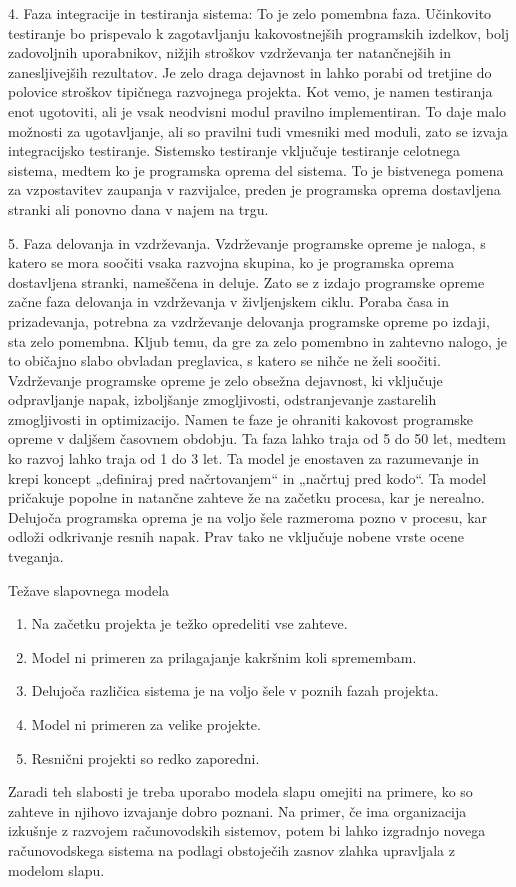 \documentclass[a4paper,12pt,openright]{book}
\begin{document}
4. Faza integracije in testiranja sistema: 
 To je zelo pomembna faza. Učinkovito testiranje bo prispevalo k zagotavljanju kakovostnejših programskih izdelkov, bolj zadovoljnih uporabnikov, nižjih stroškov vzdrževanja ter natančnejših in zanesljivejših rezultatov. Je zelo draga dejavnost in lahko porabi od tretjine do polovice stroškov tipičnega razvojnega projekta.
Kot vemo, je namen testiranja enot ugotoviti, ali je vsak neodvisni modul pravilno implementiran. To daje malo možnosti za ugotavljanje, ali so pravilni tudi vmesniki med moduli, zato se izvaja integracijsko testiranje. Sistemsko testiranje vključuje testiranje celotnega sistema, medtem ko je programska oprema del sistema. To je bistvenega pomena za vzpostavitev zaupanja v razvijalce, preden je programska oprema dostavljena stranki ali ponovno dana v najem na trgu.


5. Faza delovanja in vzdrževanja. Vzdrževanje programske opreme je naloga, s katero se mora soočiti vsaka razvojna skupina, ko je programska oprema dostavljena stranki, nameščena in deluje. Zato se z izdajo programske opreme začne faza delovanja in vzdrževanja v življenjskem ciklu.
Poraba časa in prizadevanja, potrebna za vzdrževanje delovanja programske opreme po izdaji, sta zelo pomembna. Kljub temu, da gre za zelo pomembno in zahtevno nalogo, je to običajno slabo obvladan preglavica, s katero se nihče ne želi soočiti.
Vzdrževanje programske opreme je zelo obsežna dejavnost, ki vključuje odpravljanje napak, izboljšanje zmogljivosti, odstranjevanje zastarelih zmogljivosti in optimizacijo. Namen te faze je ohraniti kakovost programske opreme v daljšem časovnem obdobju. Ta faza lahko traja od 5 do 50 let, medtem ko razvoj lahko traja od 1 do 3 let.
Ta model je enostaven za razumevanje in krepi koncept „definiraj pred načrtovanjem“ in „načrtuj pred kodo“. Ta model pričakuje popolne in natančne zahteve že na začetku procesa, kar je nerealno. Delujoča programska oprema je na voljo šele razmeroma pozno v procesu, kar odloži odkrivanje resnih napak. Prav tako ne vključuje nobene vrste ocene tveganja.

Težave slapovnega modela
\begin{enumerate}
    \item Na začetku projekta je težko opredeliti vse zahteve.
    \item Model ni primeren za prilagajanje kakršnim koli spremembam.
    \item Delujoča različica sistema je na voljo šele v poznih fazah projekta.
    \item Model ni primeren za velike projekte.
    \item Resnični projekti so redko zaporedni.
\end{enumerate}
Zaradi teh slabosti je treba uporabo modela slapu omejiti na primere, ko so zahteve in njihovo izvajanje dobro poznani. Na primer, če ima organizacija izkušnje z razvojem računovodskih sistemov, potem bi lahko izgradnjo novega računovodskega sistema na podlagi obstoječih zasnov zlahka upravljala z modelom slapu.
\end{document}

